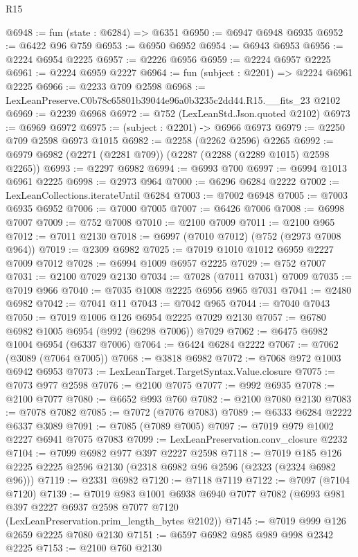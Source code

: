 \begin{lexlean}{R15}
\begin{coremodule}
@6948 := fun (state : @6284) => @6351
@6950 := @6947 @6948 @6935
@6952 := @6422 @96 @759
@6953 := @6950 @6952
@6954 := @6943 @6953
@6956 := @2224 @6954 @2225
@6957 := @2226 @6956
@6959 := @2224 @6957 @2225
@6961 := @2224 @6959 @2227
@6964 := fun (subject : @2201) => @2224 @6961 @2225
@6966 := @2233 @709 @2598
@6968 := LexLeanPreserve.C0b78c65801b39044e96a0b3235c2dd44.R15.__fits_23 @2102
@6969 := @2239 @6968
@6972 := @752 (LexLeanStd.Json.quoted @2102)
@6973 := @6969 @6972
@6975 := (subject : @2201) -> @6966 @6973
@6979 := @2250 @709 @2598 @6973 @1015
@6982 := @2258 (@2262 @2596) @2265
@6992 := @6979 @6982 (@2271 (@2281 @709)) (@2287 (@2288 (@2289 @1015) @2598 @2265))
@6993 := @2297 @6982
@6994 := @6993 @700
@6997 := @6994 @1013 @6961 @2225
@6998 := @2973 @964
@7000 := @6296 @6284 @2222
@7002 := LexLeanCollections.iterateUntil @6284
@7003 := @7002 @6948
@7005 := @7003 @6935 @6952
@7006 := @7000 @7005
@7007 := @6426 @7006
@7008 := @6998 @7007
@7009 := @752 @7008
@7010 := @2100 @7009
@7011 := @2100 @965
@7012 := @7011 @2130
@7018 := @6997 (@7010 @7012) (@752 (@2973 @7008 @964))
@7019 := @2309 @6982
@7025 := @7019 @1010 @1012 @6959 @2227 @7009 @7012
@7028 := @6994 @1009 @6957 @2225
@7029 := @752 @7007
@7031 := @2100 @7029 @2130
@7034 := @7028 (@7011 @7031) @7009
@7035 := @7019 @966
@7040 := @7035 @1008 @2225 @6956 @965 @7031
@7041 := @2480 @6982
@7042 := @7041 @11
@7043 := @7042 @965
@7044 := @7040 @7043
@7050 := @7019 @1006 @126 @6954 @2225 @7029 @2130
@7057 := @6780 @6982 @1005 @6954 (@992 (@6298 @7006)) @7029
@7062 := @6475 @6982 @1004 @6954 (@6337 @7006)
@7064 := @6424 @6284 @2222
@7067 := @7062 (@3089 (@7064 @7005))
@7068 := @3818 @6982
@7072 := @7068 @972 @1003 @6942 @6953
@7073 := LexLeanTarget.TargetSyntax.Value.closure
@7075 := @7073 @977 @2598
@7076 := @2100 @7075
@7077 := @992 @6935
@7078 := @2100 @7077
@7080 := @6652 @993 @760
@7082 := @2100 @7080 @2130
@7083 := @7078 @7082
@7085 := @7072 (@7076 @7083)
@7089 := @6333 @6284 @2222 @6337 @3089
@7091 := @7085 (@7089 @7005)
@7097 := @7019 @979 @1002 @2227 @6941 @7075 @7083
@7099 := LexLeanPreservation.conv_closure @2232
@7104 := @7099 @6982 @977 @397 @2227 @2598
@7118 := @7019 @185 @126 @2225 @2225 @2596 @2130 (@2318 @6982 @96 @2596 (@2323 (@2324 @6982 @96)))
@7119 := @2331 @6982
@7120 := @7118 @7119
@7122 := @7097 (@7104 @7120)
@7139 := @7019
    @983
    @1001
    @6938
    @6940
    @7077
    @7082
    (@6993 @981 @397 @2227 @6937 @2598 @7077 @7120 (LexLeanPreservation.prim_length_bytes @2102))
@7145 := @7019 @999 @126 @2659 @2225 @7080 @2130
@7151 := @6597 @6982 @985 @989 @998 @2342 @2225
@7153 := @2100 @760 @2130

\end{coremodule}
\end{lexlean}
